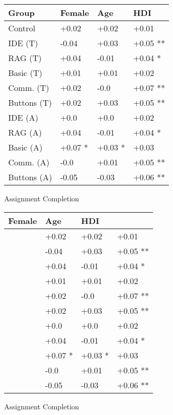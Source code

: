 \centering
\begin{tabular}{llll}
\toprule
Group & Female & Age & HDI \\ \midrule
Control  & +0.02 & +0.02 & +0.01\\
IDE (T)  & -0.04 & +0.03 & +0.05 **\\
RAG (T)  & +0.04 & -0.01 & +0.04 *\\
Basic (T)  & +0.01 & +0.01 & +0.02\\
Comm. (T)  & +0.02 & -0.0 & +0.07 **\\
Buttons (T)  & +0.02 & +0.03 & +0.05 **\\
IDE (A)  & +0.0 & +0.0 & +0.02\\
RAG (A)  & +0.04 & -0.01 & +0.04 *\\
Basic (A)  & +0.07 * & +0.03 * & +0.03\\
Comm. (A)  & -0.0 & +0.01 & +0.05 **\\
Buttons (A)  & -0.05 & -0.03 & +0.06 **\\
\bottomrule
\end{tabular}
\caption{Assignment Completion}
\label{tab:demo_table}
\centering
\begin{tabular}{lll}
\toprule
Female & Age & HDI \\ \midrule
 & +0.02 & +0.02 & +0.01\\
 & -0.04 & +0.03 & +0.05 **\\
 & +0.04 & -0.01 & +0.04 *\\
 & +0.01 & +0.01 & +0.02\\
 & +0.02 & -0.0 & +0.07 **\\
 & +0.02 & +0.03 & +0.05 **\\
 & +0.0 & +0.0 & +0.02\\
 & +0.04 & -0.01 & +0.04 *\\
 & +0.07 * & +0.03 * & +0.03\\
 & -0.0 & +0.01 & +0.05 **\\
 & -0.05 & -0.03 & +0.06 **\\
\bottomrule
\end{tabular}
\caption{Assignment Completion}
\label{tab:demo_table}
